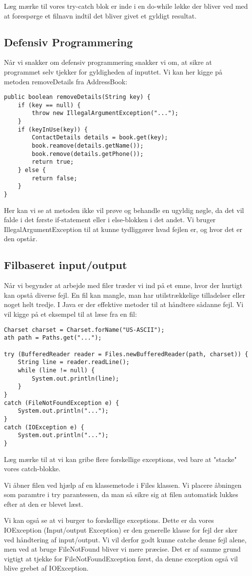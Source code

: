 \documentclass{article}
\begin{document}
Læg mærke til vores try-catch blok er inde i en do-while løkke der bliver ved med at forespørge et filnavn indtil det bliver givet et gyldigt resultat.

\subsection*{Defensiv Programmering}
Når vi snakker om defensiv programmering snakker vi om, at sikre at programmet selv tjekker for gyldigheden af inputtet. Vi kan her kigge på metoden removeDetails fra AddressBook:

\begin{verbatim}
public boolean removeDetails(String key) {
    if (key == null) {
        throw new IllegalArgumentException("...");
    }
    if (keyInUse(key)) {
        ContactDetails details = book.get(key);
        book.reamove(details.getName());
        book.remove(details.getPhone());
        return true;
    } else {
        return false;
    }
}
\end{verbatim}

Her kan vi se at metoden ikke vil prøve og behandle en ugyldig nøgle, da det vil falde i det første if-statement eller i else-blokken i det andet.
Vi bruger IllegalArgumentException til at kunne tydliggører hvad fejlen er, og hvor det er den opstår.

\subsection*{Filbaseret input/output}
Når vi begynder at arbejde med filer træder vi ind på et emne, hvor der hurtigt kan opstå diverse fejl. En fil kan mangle, man har utilstrækkelige tilladelser eller noget helt tredje. I Java er der effektive metoder til at håndtere sådanne fejl. Vi vil kigge på et eksempel til at læse fra en fil:

\begin{verbatim}
Charset charset = Charset.forName("US-ASCII");
ath path = Paths.get("...");

try (BufferedReader reader = Files.newBufferedReader(path, charset)) {
    String line = reader.readLine();
    while (line != null) {
        System.out.println(line);
    }
}
catch (FileNotFoundException e) {
    System.out.println("...");
}
catch (IOException e) {
    System.out.println("...");
}
\end{verbatim}
Læg mærke til at vi kan gribe flere forskellige exceptions, ved bare at "stacke" vores catch-blokke. 

Vi åbner filen ved hjælp af en klassemetode i Files klassen. Vi placere åbningen som paramtre i try parantessen, da man så sikre sig at filen automatisk lukkes efter at den er blevet læst.

Vi kan også se at vi burger to forskellige exceptions. Dette er da vores IOException (Input/output Exception) er den generelle klasse for fejl der sker ved håndtering af input/output. Vi vil derfor godt kunne catche denne fejl alene, men ved at bruge FileNotFound bliver vi mere præcise. Det er af samme grund vigtigt at tjekke for FileNotFoundException først, da denne exception også vil blive grebet af IOException.
\end{document}
